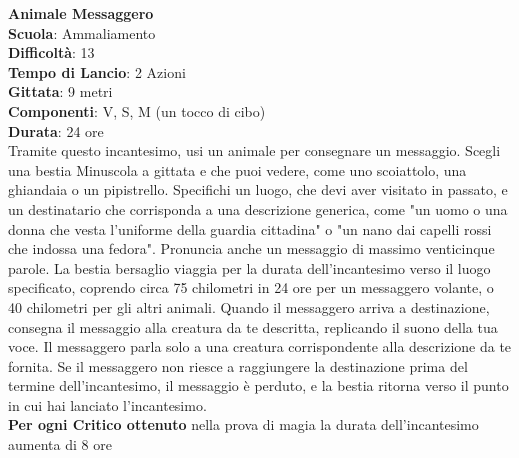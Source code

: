 \begin{multicols}{2}
\medskip\textbf{Animale Messaggero}\\
\textbf{Scuola}: Ammaliamento\\
\textbf{Difficoltà}: 13\\
\textbf{Tempo di Lancio}: 2 Azioni\\
\textbf{Gittata}: 9 metri\\
\textbf{Componenti}: V, S, M (un tocco di cibo)\\
\textbf{Durata}: 24 ore\\
Tramite questo incantesimo, usi un animale per consegnare un messaggio. Scegli una bestia Minuscola a gittata e che puoi vedere, come uno scoiattolo, una ghiandaia o un pipistrello. Specifichi un luogo, che devi aver visitato in passato, e un destinatario che corrisponda a una descrizione generica, come "un uomo o una donna che vesta l'uniforme della guardia cittadina" o "un nano dai capelli rossi che indossa una fedora". Pronuncia anche un messaggio di massimo venticinque parole. La bestia bersaglio viaggia per la durata dell'incantesimo verso il luogo specificato, coprendo circa 75 chilometri in 24 ore per un messaggero volante, o 40 chilometri per gli altri animali. Quando il messaggero arriva a destinazione, consegna il messaggio alla creatura da te descritta, replicando il suono della tua voce. Il messaggero parla solo a una creatura corrispondente alla descrizione da te fornita. Se il messaggero non riesce a raggiungere la destinazione prima del termine dell'incantesimo, il messaggio è perduto, e la bestia ritorna verso il punto in cui hai lanciato l'incantesimo.\\
\textbf{Per ogni Critico ottenuto} nella prova di magia la durata dell'incantesimo aumenta di 8 ore


\end{multicols}

